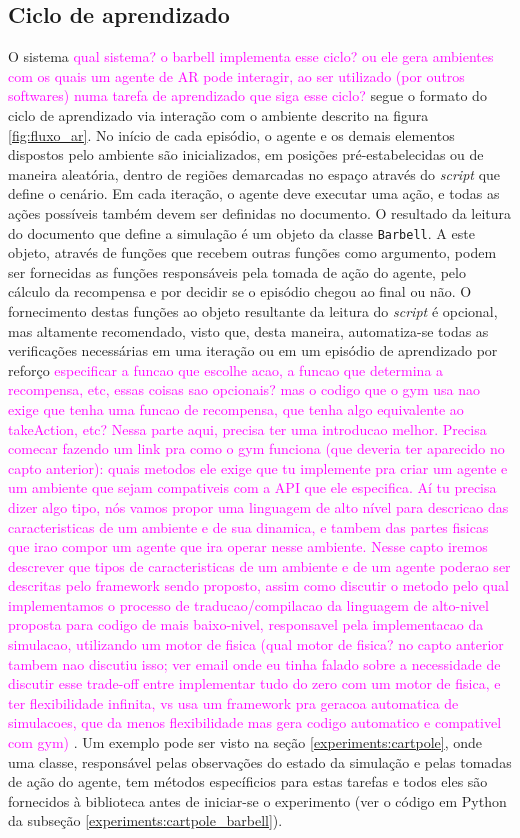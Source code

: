 \documentclass[cic,tc]{iiufrgs}
\newcommand\bruno[1]{\textcolor{magenta}{#1}}
\begin{document}
    \subsection{Ciclo de aprendizado}
    O sistema \bruno{qual sistema? o barbell implementa esse ciclo? ou ele gera ambientes com os quais um agente de AR pode interagir, ao ser utilizado (por outros softwares) numa tarefa de aprendizado que siga esse ciclo?} segue o formato do ciclo de aprendizado via interação com o ambiente descrito na figura \ref{fig:fluxo_ar}. No início de cada episódio, o agente e os demais
    elementos dispostos pelo ambiente são inicializados, em posições pré-estabelecidas ou de maneira  aleatória, dentro de regiões demarcadas no espaço através do \textit{script}
    que define o cenário. Em cada iteração, o agente deve executar uma ação, e todas as ações possíveis também devem ser definidas no documento. O resultado da leitura do
    documento que define a simulação é um objeto da classe \texttt{Barbell}. A este objeto, através de funções que recebem outras funções como argumento, podem ser
    fornecidas as funções responsáveis pela tomada de ação do agente, pelo cálculo da recompensa e por decidir se o episódio chegou ao final ou não. O fornecimento
    destas funções ao objeto resultante da leitura do \textit{script} é opcional, mas altamente recomendado, visto que, desta maneira, automatiza-se todas as verificações
    necessárias em uma iteração ou em um episódio de aprendizado por reforço \bruno{especificar a funcao que escolhe acao, a funcao que determina a recompensa, etc, essas coisas sao opcionais? mas o codigo que o gym usa nao exige que tenha uma funcao de recompensa, que tenha algo equivalente ao takeAction, etc? Nessa parte aqui, precisa ter uma introducao melhor. Precisa comecar fazendo um link pra como o gym funciona (que deveria ter aparecido no capto anterior): quais metodos ele exige que tu implemente pra criar um agente e um ambiente que sejam compativeis com a API que ele especifica. Aí tu precisa dizer algo tipo, nós vamos propor uma linguagem de alto nível para descricao das caracteristicas de um ambiente e de sua dinamica, e tambem das partes fisicas que irao compor um agente que ira operar nesse ambiente. Nesse capto iremos descrever que tipos de caracteristicas de um ambiente e de um agente poderao ser descritas pelo framework sendo proposto, assim como discutir o metodo pelo qual implementamos o processo de traducao/compilacao da linguagem de alto-nivel proposta para codigo de mais baixo-nivel, responsavel pela implementacao da simulacao, utilizando um motor de fisica (qual motor de fisica? no capto anterior tambem nao discutiu isso; ver email onde eu tinha falado sobre a necessidade de discutir esse trade-off entre implementar tudo do zero com um motor de fisica, e ter flexibilidade infinita, vs usa um framework pra geracoa automatica de simulacoes, que da menos flexibilidade mas gera codigo automatico e compativel com gym)} . Um exemplo pode ser visto na seção \ref{experiments:cartpole}, onde uma classe, responsável
    pelas observações do estado da simulação e pelas tomadas de ação do agente, tem métodos específicios para estas tarefas e todos eles são fornecidos à biblioteca
    antes de iniciar-se o experimento (ver o código em Python da subseção \ref{experiments:cartpole_barbell}).
\end{document}

